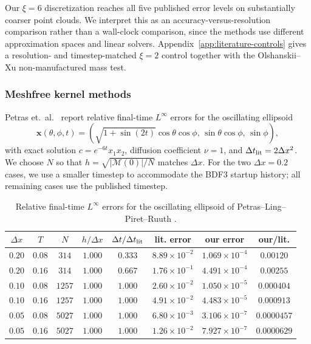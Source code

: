 \documentclass[a4paper,fleqn]{cas-sc}
\begin{document}
Our \(\xi=6\) discretization reaches all five published error levels on
substantially coarser point clouds.  We interpret this as an
accuracy-versus-resolution comparison rather than a wall-clock comparison,
since the methods use different approximation spaces and linear solvers.  Appendix~\ref{app:literature-controls} gives a resolution- and
timestep-matched \(\xi=2\) control together with the Olshanskii--Xu
non-manufactured mass test.

\subsubsection{Meshfree kernel methods}
\label{subsubsec:kernel-literature-comparisons}

Petras et.\ al.~\cite{PetrasLingPiretRuuth2019LSRBFCPM} report relative final-time
\(L^\infty\) errors for the oscillating ellipsoid
\[
  \bm x(\theta,\phi,t)
  =
  \left(
    \sqrt{1+\sin(2t)}\cos\theta\cos\phi,\,
    \sin\theta\cos\phi,\,
    \sin\phi
  \right),
\]
with exact solution \(c=e^{-6t}x_1x_2\), diffusion coefficient \(\nu=1\),
and \(\Delta t_{\rm lit}=2\Delta x^2\).  We choose \(N\) so that
\(h=\sqrt{|\mathcal M(0)|/N}\) matches \(\Delta x\).  For the two
\(\Delta x=0.2\) cases, we use a smaller timestep to accommodate the BDF3
startup history; all remaining cases use the published timestep.

\begin{table}[t]
\centering
\caption{Relative final-time \(L^\infty\) errors for the oscillating
ellipsoid of Petras--Ling--Piret--Ruuth
\cite{PetrasLingPiretRuuth2019LSRBFCPM}.}
\scriptsize
\setlength{\tabcolsep}{3pt}
\label{tab:petras-ling-ellipsoid}
\begin{tabular}{c c c c c c c c}
\toprule
\(\Delta x\) & \(T\) & \(N\) & \(h/\Delta x\) &
\(\Delta t/\Delta t_{\rm lit}\) & lit. error & our error & our/lit. \\
\midrule
\(0.20\) & \(0.08\) & \(314\) & \(1.000\) & \(0.333\) &
\(8.89{\times}10^{-2}\) & \(1.069{\times}10^{-4}\) & \(0.00120\) \\
\(0.20\) & \(0.16\) & \(314\) & \(1.000\) & \(0.667\) &
\(1.76{\times}10^{-1}\) & \(4.491{\times}10^{-4}\) & \(0.00255\) \\
\(0.10\) & \(0.08\) & \(1257\) & \(1.000\) & \(1.000\) &
\(2.60{\times}10^{-2}\) & \(1.050{\times}10^{-5}\) & \(0.000404\) \\
\(0.10\) & \(0.16\) & \(1257\) & \(1.000\) & \(1.000\) &
\(4.91{\times}10^{-2}\) & \(4.483{\times}10^{-5}\) & \(0.000913\) \\
\(0.05\) & \(0.08\) & \(5027\) & \(1.000\) & \(1.000\) &
\(6.80{\times}10^{-3}\) & \(3.106{\times}10^{-7}\) & \(0.0000457\) \\
\(0.05\) & \(0.16\) & \(5027\) & \(1.000\) & \(1.000\) &
\(1.26{\times}10^{-2}\) & \(7.927{\times}10^{-7}\) & \(0.0000629\) \\
\bottomrule
\end{tabular}
\end{table}
\end{document}
